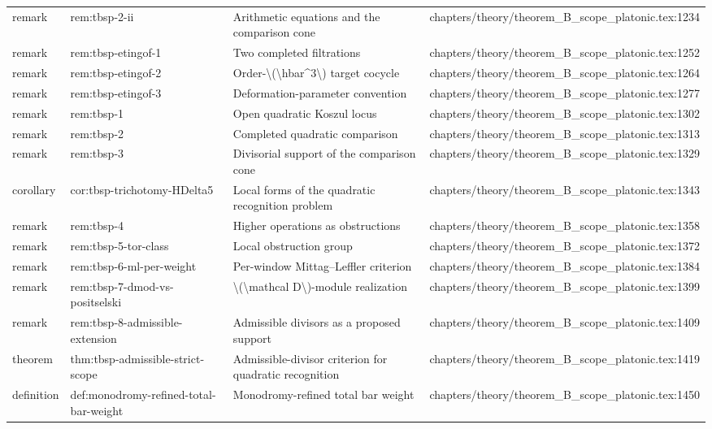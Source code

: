 \documentclass[11pt]{article}
\begin{document}
\begin{longtable}{L{0.10\textwidth}L{0.26\textwidth}L{0.42\textwidth}L{0.22\textwidth}}
remark & rem:tbsp-2-ii & Arithmetic equations and the comparison cone & chapters/theory/theorem\_B\_scope\_platonic.tex:1234\\
remark & rem:tbsp-etingof-1 & Two completed filtrations & chapters/theory/theorem\_B\_scope\_platonic.tex:1252\\
remark & rem:tbsp-etingof-2 & Order-\textbackslash{}(\textbackslash{}hbar\textasciicircum{}3\textbackslash{}) target cocycle & chapters/theory/theorem\_B\_scope\_platonic.tex:1264\\
remark & rem:tbsp-etingof-3 & Deformation-parameter convention & chapters/theory/theorem\_B\_scope\_platonic.tex:1277\\
remark & rem:tbsp-1 & Op{}en quadratic Koszul locus & chapters/theory/theorem\_B\_scope\_platonic.tex:1302\\
remark & rem:tbsp-2 & Completed quadratic comparison & chapters/theory/theorem\_B\_scope\_platonic.tex:1313\\
remark & rem:tbsp-3 & Divisorial support of the comparison cone & chapters/theory/theorem\_B\_scope\_platonic.tex:1329\\
corollary & cor:tbsp-trichotomy-HDelta5 & Local forms of the quadratic recognition problem & chapters/theory/theorem\_B\_scope\_platonic.tex:1343\\
remark & rem:tbsp-4 & Higher operations as obstructions & chapters/theory/theorem\_B\_scope\_platonic.tex:1358\\
remark & rem:tbsp-5-tor-class & Local obstruction group & chapters/theory/theorem\_B\_scope\_platonic.tex:1372\\
remark & rem:tbsp-6-ml-per-weight & Per-window Mittag--Leffler criterion & chapters/theory/theorem\_B\_scope\_platonic.tex:1384\\
remark & rem:tbsp-7-dmod-vs-positselski & \textbackslash{}(\textbackslash{}mathcal D\textbackslash{})-module realization & chapters/theory/theorem\_B\_scope\_platonic.tex:1399\\
remark & rem:tbsp-8-admissible-extension & Admissible divisors as a proposed support & chapters/theory/theorem\_B\_scope\_platonic.tex:1409\\
theorem & thm:tbsp-admissible-strict-scope & Admissible-divisor criterion for quadratic recognition & chapters/theory/theorem\_B\_scope\_platonic.tex:1419\\
definition & def:monodromy-refined-total-bar-weight & Monodromy-refined total bar weight & chapters/theory/theorem\_B\_scope\_platonic.tex:1450\\

\end{longtable}
\end{document}
